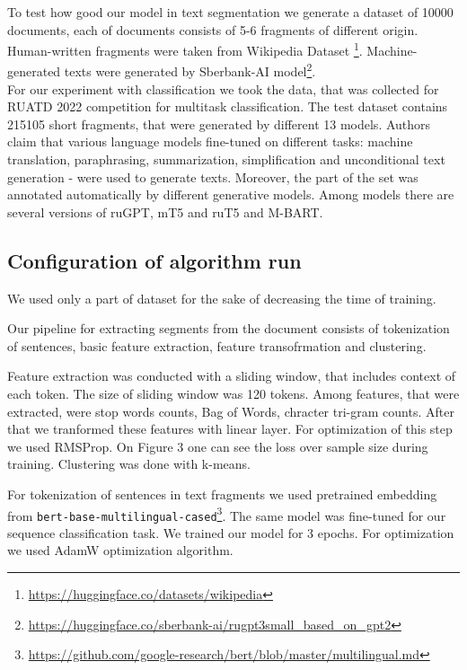 \documentclass{article}
\begin{document}
To test how good our model in text segmentation we generate a dataset of 10000 documents, each of documents consists of 5-6 fragments of different origin. Human-written fragments were taken from Wikipedia Dataset \footnote{\url{https://huggingface.co/datasets/wikipedia}}. Machine-generated texts were generated by Sberbank-AI model\footnote{\url{https://huggingface.co/sberbank-ai/rugpt3small_based_on_gpt2}}. \\
For our experiment with classification we took the data, that was collected for RUATD 2022 competition\cite{ruatd-dataset} for multitask classification. The test dataset contains 215105 short fragments, that were generated by different 13 models. Authors claim that various language models fine-tuned on different tasks: machine translation, paraphrasing, summarization, simplification and unconditional text generation - were used to generate texts. Moreover, the part of the set was annotated automatically by different generative models. Among models there are several versions of ruGPT, mT5 and ruT5 and M-BART.

\subsection{Configuration of algorithm run}

We used only a part of dataset for the sake of decreasing the time of training. 

Our pipeline for extracting segments from the document consists of tokenization of sentences, basic feature extraction, feature transofrmation and clustering. 

Feature extraction was conducted with a sliding window, that includes context of each token. The size of sliding window was 120 tokens. Among features, that were extracted, were stop words counts, Bag of Words, chracter tri-gram counts. After that we tranformed these features with linear layer. For optimization of this step we used RMSProp. On Figure 3 one can see the loss over sample size during training. Clustering was done with k-means.


For tokenization of sentences in text fragments we used pretrained embedding from \texttt{bert-base-multilingual-cased}\footnote{\url{https://github.com/google-research/bert/blob/master/multilingual.md}}. The same model was fine-tuned for our sequence classification task. We trained our model for 3 epochs. For optimization we used AdamW optimization algorithm\cite{adam-w}.
\end{document}
